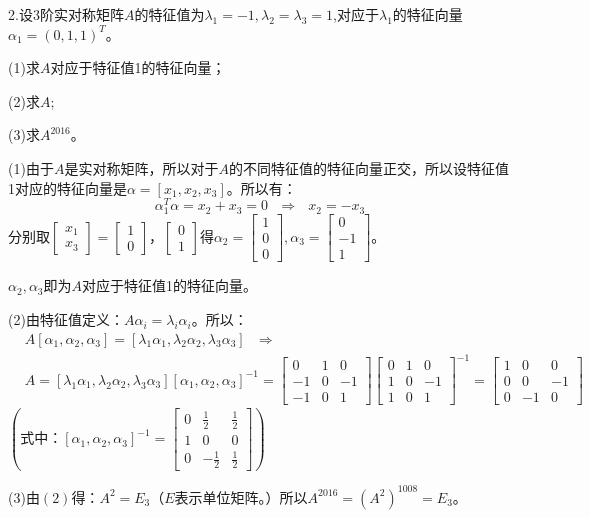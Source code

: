 \documentclass{article}
\begin{document}
2.设3阶实对称矩阵$A$的特征值为$\lambda_{1}=-1,\lambda_{2}=\lambda_{3}=1$,对应于$\lambda_{1}$的特征向量$\alpha_{1}=(0,1,1)^{T}$。

(1)求$A$对应于特征值1的特征向量；

(2)求$A$;

(3)求$A^{2016}$。

\begin{jie}
(1)由于$A$是实对称矩阵，所以对于$A$的不同特征值的特征向量正交，所以设特征值1对应的特征向量是$\alpha=[x_1,x_2,x_3]$。所以有：
\begin{equation*}
\alpha_{1}^T\alpha=x_2+x_3=0~~~\Rightarrow~~~x_2=-x_3
\end{equation*}
分别取$
\begin{bmatrix}
x_1 \\ x_3
\end{bmatrix}=\begin{bmatrix}
1 \\ 0
\end{bmatrix}，
\begin{bmatrix}
0 \\ 1
\end{bmatrix}
$得$\alpha_{2}=
\begin{bmatrix}
1 \\ 0 \\0
\end{bmatrix}
,\alpha_3=
\begin{bmatrix}
0\\ -1 \\1
\end{bmatrix}$。

$\alpha_2,\alpha_3$即为$A$对应于特征值1的特征向量。

(2)由特征值定义：$A\alpha_i=\lambda_i\alpha_i$。所以：
\begin{align*}
&A[\alpha_1,\alpha_2,\alpha_3]=[\lambda_1\alpha_1,\lambda_2\alpha_2,\lambda_3\alpha_3] ~~~\Rightarrow\\
&A=[\lambda_1\alpha_1,\lambda_2\alpha_2,\lambda_3\alpha_3] [\alpha_1,\alpha_2,\alpha_3]^{-1}=
\begin{bmatrix}
  0 & 1  & 0\\
 -1 & 0&-1\\
 -1 & 0& 1
\end{bmatrix}
\begin{bmatrix}
  0 & 1  & 0\\
 1 & 0&-1\\
 1 & 0& 1
\end{bmatrix}^{-1}=
\begin{bmatrix}
  1 & 0  & 0\\
 0 & 0&-1\\
 0 & -1& 0
\end{bmatrix}
\end{align*}
$\left(\text{式中：}[\alpha_1,\alpha_2,\alpha_3]^{-1}=
\begin{bmatrix}
  0 & \frac{1}{2} & \frac{1}{2}\\
 1 & 0&0\\
  0 & -\frac{1}{2} & \frac{1}{2}
\end{bmatrix}
\right)$

(3)由$(2)$得：$A^2=E_3$（$E$表示单位矩阵。）所以$A^{2016}=(A^{2})^{1008}=E_3$。
\end{jie}
\end{document}
